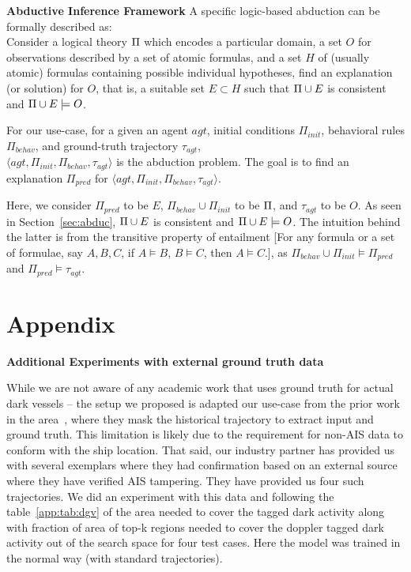 \noindent\textbf{Abductive Inference Framework}
A specific logic-based abduction can be formally described as: \\
Consider a logical theory $\Pi$ which encodes a particular domain, a set $O$ for observations described by a set of atomic formulas, and a
set $H$ of (usually atomic) formulas containing possible individual hypotheses,
find an explanation (or solution) for $O$, that is, a suitable set $E  \subset  H$ such that
$\Pi \cup E$ is consistent and  $\Pi \cup E \models O$. 

For our use-case, for a given an agent $agt$, initial conditions $\Pi_{init}$, behavioral rules $\Pi_{behav}$, and ground-truth trajectory $\tau_{agt}$, \\ $\langle agt, \Pi_{init}, \Pi_{behav}, \tau_{agt} \rangle$ is the abduction problem. The goal is to find an explanation $\Pi_{pred}$ for $\langle agt, \Pi_{init}, \Pi_{behav}, \tau_{agt} \rangle$.

Here, we consider $\Pi_{pred}$ to be $E$, $\Pi_{behav} \cup \Pi_{init}$ to be $\Pi$, and  $\tau_{agt}$ to be $O$. As seen in Section~\ref{sec:abduc}, $\Pi \cup E$ is consistent and  $\Pi \cup E \models O$. The intuition behind the latter is from the transitive property of entailment [For any formula or a set of formulae, say $A, B, C$, if $ A \models B$, $ B \models C$, then $ A \models C$.], as $\Pi_{behav} \cup \Pi_{init} \models \Pi_{pred}$ and $\Pi_{pred} \models \tau_{agt}$.

\section{Appendix}{\bf Additional Experiments with external ground truth data}
\label{app:dgv}

While we are not aware of any academic work that uses ground truth for actual dark vessels – the setup we proposed is adapted our use-case from the prior work in the area~\cite{dlbaseline,dstnet,txlstm, tf, tf2, tp}, where they mask the historical trajectory to extract input and ground truth.  This limitation is likely due to the requirement for non-AIS data to conform with the ship location. That said, our industry partner has provided us with several exemplars where they had confirmation based on an external source where they have verified AIS tampering.  They have provided us four such trajectories.  We did an experiment with this data and following the table~\ref{app:tab:dgv} of the area needed to cover the tagged dark activity along with fraction of area of top-k regions needed to cover the doppler tagged dark activity out of the search space for four test cases.  Here the model was trained in the normal way (with standard trajectories). 

